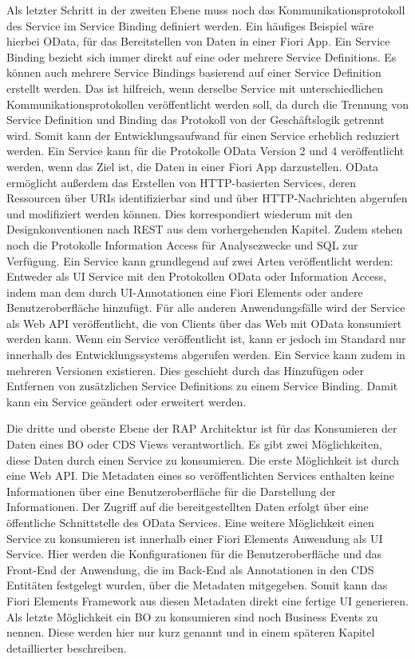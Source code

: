 Als letzter Schritt in der zweiten Ebene muss noch das Kommunikationsprotokoll des Service im Service Binding definiert werden. Ein häufiges Beispiel wäre hierbei OData, für das Bereitstellen von Daten in einer Fiori App. Ein Service Binding bezieht sich immer direkt auf eine oder mehrere Service Definitions. Es können auch mehrere Service Bindings basierend auf einer Service Definition erstellt werden. Das ist \zB hilfreich, wenn derselbe Service mit unterschiedlichen Kommunikationsprotokollen veröffentlicht werden soll, da durch die Trennung von Service Definition und Binding das Protokoll von der Geschäftslogik getrennt wird. Somit kann der Entwicklungsaufwand für einen Service erheblich reduziert werden. Ein Service kann für die Protokolle OData Version 2 und 4 veröffentlicht werden, wenn das Ziel ist, die Daten in einer Fiori App darzustellen. OData ermöglicht au{\ss}erdem das Erstellen von HTTP-basierten Services, deren Ressourcen über URIs identifizierbar sind und über HTTP-Nachrichten abgerufen und modifiziert werden können. Dies korrespondiert wiederum mit den Designkonventionen nach REST aus dem vorhergehenden Kapitel. Zudem stehen noch die Protokolle Information Access für Analysezwecke und SQL zur Verfügung. Ein Service kann grundlegend auf zwei Arten veröffentlicht werden: Entweder als UI Service mit den Protokollen OData oder Information Access, indem man dem durch UI-Annotationen eine Fiori Elements oder andere Benutzeroberfläche hinzufügt. Für alle anderen Anwendungsfälle wird der Service als Web API veröffentlicht, die von Clients über das Web mit OData konsumiert werden kann. Wenn ein Service veröffentlicht ist, kann er jedoch im Standard nur innerhalb des Entwicklungssystems abgerufen werden. Ein Service kann zudem in mehreren Versionen existieren. Dies geschieht durch das Hinzufügen oder Entfernen von zusätzlichen Service Definitions zu einem Service Binding. Damit kann ein Service geändert oder erweitert werden.

Die dritte und oberste Ebene der RAP Architektur ist für das Konsumieren der Daten eines BO oder CDS Views verantwortlich. Es gibt zwei Möglichkeiten, diese Daten durch einen Service zu konsumieren. Die erste Möglichkeit ist durch eine Web API. Die Metadaten eines so veröffentlichten Services enthalten keine Informationen über eine Benutzeroberfläche für die Darstellung der Informationen. Der Zugriff auf die bereitgestellten Daten erfolgt über eine öffentliche Schnittstelle des OData Services. Eine weitere Möglichkeit einen Service zu konsumieren ist innerhalb einer Fiori Elements Anwendung als UI Service. Hier werden die Konfigurationen für die Benutzeroberfläche und das Front-End der Anwendung, die im Back-End als Annotationen in den CDS Entitäten festgelegt wurden, über die Metadaten mitgegeben. Somit kann das Fiori Elements Framework aus diesen Metadaten direkt eine fertige UI generieren. Als letzte Möglichkeit ein BO zu konsumieren sind noch Business Events zu nennen. Diese werden hier nur kurz genannt und in einem späteren Kapitel detaillierter beschreiben.

